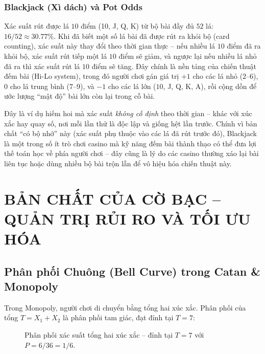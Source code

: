 \documentclass[12pt,a4paper]{article}
\theoremstyle{coloredthm}
\theoremstyle{coloreddef}
\theoremstyle{remark}
\begin{document}
\subsubsection{Blackjack (Xì dách) và Pot Odds}

Xác suất rút được lá $10$ điểm (10, J, Q, K) từ bộ bài đầy đủ $52$ lá: $16/52 \approx 30.77\%$. Khi đã biết một số lá bài đã được rút ra khỏi bộ (card counting), xác suất này thay đổi theo thời gian thực -- nếu nhiều lá $10$ điểm đã ra khỏi bộ, xác suất rút tiếp một lá $10$ điểm sẽ giảm, và ngược lại nếu nhiều lá nhỏ đã ra thì xác suất rút lá $10$ điểm sẽ tăng. Đây chính là nền tảng của chiến thuật đếm bài (Hi-Lo system), trong đó người chơi gán giá trị $+1$ cho các lá nhỏ ($2$--$6$), $0$ cho lá trung bình ($7$--$9$), và $-1$ cho các lá lớn ($10$, J, Q, K, A), rồi cộng dồn để ước lượng ``mật độ'' bài lớn còn lại trong cỗ bài.

\begin{ungdung}
Đây là ví dụ hiếm hoi mà xác suất \emph{không cố định} theo thời gian -- khác với xúc xắc hay quay số, nơi mỗi lần thử là độc lập và giống hệt lần trước. Chính vì bản chất ``có bộ nhớ'' này (xác suất phụ thuộc vào các lá đã rút trước đó), Blackjack là một trong số ít trò chơi casino mà kỹ năng đếm bài thành thạo có thể đưa lợi thế toán học về phía người chơi -- đây cũng là lý do các casino thường xáo lại bài liên tục hoặc dùng nhiều bộ bài trộn lẫn để vô hiệu hóa chiến thuật này.
\end{ungdung}

\section{BẢN CHẤT CỦA CỜ BẠC -- QUẢN TRỊ RỦI RO VÀ TỐI ƯU HÓA}

\subsection{Phân phối Chuông (Bell Curve) trong Catan \& Monopoly}

Trong Monopoly, người chơi di chuyển bằng tổng hai xúc xắc. Phân phối của tổng $T = X_1 + X_2$ là phân phối tam giác, đạt đỉnh tại $T=7$:

\begin{figure}[H]
\centering
{}
\caption{Phân phối xác suất tổng hai xúc xắc -- đỉnh tại $T=7$ với $P=6/36=1/6$.}
\end{figure}
\end{document}
